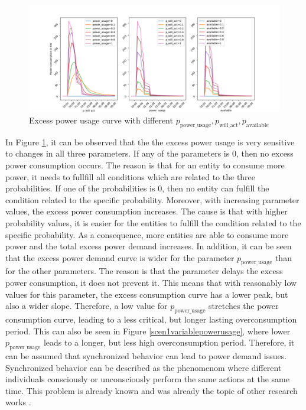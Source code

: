 \begin{figure}[!ht]
    \centering
    \includegraphics[scale=.5]{figs/eval/scenario1/powervars.png}
    \caption{Excess power usage curve with different 
    $p_{\mathrm{power\_usage}}, p_{\mathrm{will\_act}}, 
    p_{\mathrm{available}}$}
    \label{scen1variablepowervals} 
\end{figure}

In Figure \ref{scen1variablepowervals}, it can be observed that
the the excess power usage is very sensitive to changes in all
three parameters. If any of the parameters is $0$, then no
excess power consumption occurs. The reason is that 
for an entity to consume more power, it needs to fullfill
all conditions which are related to the three 
probabilities. If one of the probabilities is $0$, then 
no entity can fulfill the condition related to the 
specific probability. Moreover, with increasing parameter
values, the excess power consumption increases. The 
cause is that with higher probability values, it is 
easier for the entities to fulfill the condition
related to the specific probability. As a 
consequence, more entities are able to consume more 
power and the total excess power demand increases.
In addition, it can be seen that the excess power 
demand curve is wider for the parameter 
$p_{\mathrm{power\_usage}}$ than for the other parameters.
The reason is that the parameter delays the 
excess power consumption, it does not prevent it.
This means that with reasonably low values for 
this parameter, the excess consumption curve 
has a lower peak, but also a wider slope.
Therefore, a low value for $p_{\mathrm{power\_usage}}$
stretches the power consumption curve, leading
to a less critical, but longer lasting 
overconsumption period. This can also be seen in Figure 
\ref{scen1variablepowerusage}, where lower 
$p_{\mathrm{power\_usage}}$ leads to 
a longer, but less high overconsumption period.
Therefore, it can be assumed that synchronized 
behavior can lead to power demand issues.
Synchronized behavior can be described 
as the phenomenom where different individuals
consciously or unconsciously
perform the same actions at the same time.
This problem is already known and was
already the topic of other research works
\cite{lei2014impact} \cite{walker2014dynamics}
\cite{gebhard2022monitoring}.

